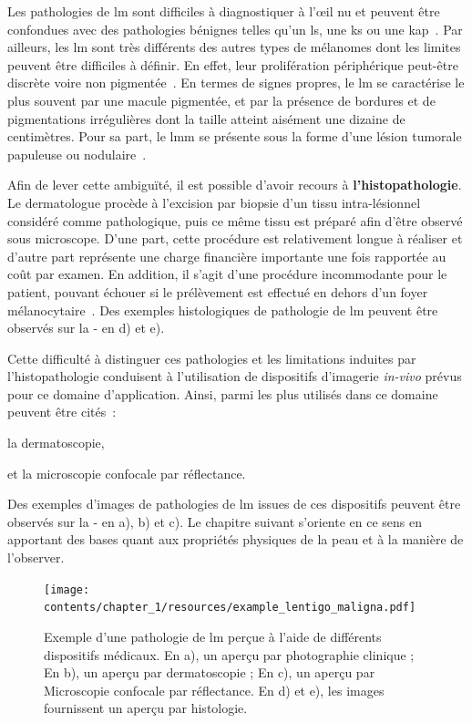 Les pathologies de \gls{lm} sont difficiles à diagnostiquer à l’œil nu et peuvent être confondues avec des pathologies bénignes telles qu'un \gls{ls}, une \gls{ks} ou une \gls{kap}~\cite{LeDuff2014}. Par ailleurs, les \gls{lm} sont très différents des autres types de mélanomes dont les limites peuvent être difficiles à définir. En effet, leur prolifération périphérique peut-être discrète voire non pigmentée~\cite{LeGal2011}. En termes de signes propres, le \gls{lm} se caractérise le plus souvent par une macule pigmentée, et par la présence de bordures et de pigmentations irrégulières dont la taille atteint aisément une dizaine de centimètres. Pour sa part, le \gls{lmm} se présente sous la forme d'une lésion tumorale papuleuse ou nodulaire~\cite{Mckenna2006, LeGal2011}.\par

Afin de lever cette ambiguïté, il est possible d'avoir recours à \textbf{l'histopathologie}. Le dermatologue procède à l'excision par biopsie d'un tissu intra-lésionnel considéré comme pathologique, puis ce même tissu est préparé afin d'être observé sous microscope. D'une part, cette procédure est relativement longue à réaliser et d'autre part représente une charge financière importante une fois rapportée au coût par examen. En addition, il s'agit d'une procédure incommodante pour le patient, pouvant échouer si le prélèvement est effectué en dehors d'un foyer mélanocytaire~\cite{LeGal2011}. Des exemples histologiques de pathologie de \gls{lm} peuvent être observés sur la  - en d) et e).\par

Cette difficulté à distinguer ces pathologies et les limitations induites par l'histopathologie conduisent à l'utilisation de dispositifs d'imagerie \textit{in-vivo} prévus pour ce domaine d'application. Ainsi, parmi les plus utilisés dans ce domaine peuvent être cités~:
\begin{inlinerate}
    \item la dermatoscopie,
    \item et la microscopie confocale par réflectance.
\end{inlinerate} Des exemples d'images de pathologies de \gls{lm} issues de ces dispositifs peuvent être observés sur la  - en a), b) et c). Le chapitre suivant s'oriente en ce sens en apportant des bases quant aux propriétés physiques de la peau et à la manière de l'observer.\par

\begin{figure}[H]
    \centering
    \texttt{[image: contents/chapter\_1/resources/example\_lentigo\_maligna.pdf]}
    \caption{Exemple d'une pathologie de \gls{lm} perçue à l'aide de différents dispositifs médicaux. En a), un aperçu par photographie clinique ; En b), un aperçu par dermatoscopie ; En c), un aperçu par Microscopie confocale par réflectance. En d) et e), les images fournissent un aperçu par histologie.}
    \label{fig:example_lentigo_maligna}
\end{figure}\par